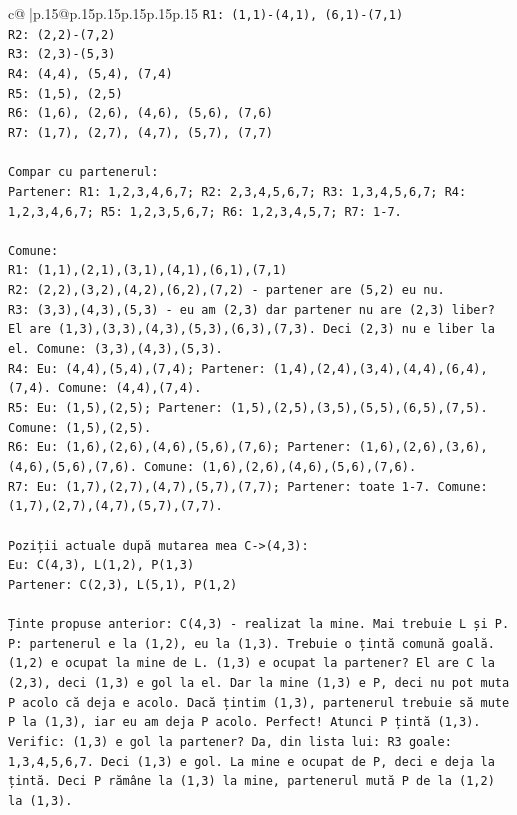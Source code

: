 \documentclass{article}
\begin{document}
{\begin{supertabular}{c@{$\;$}|p{.15\linewidth}@{}p{.15\linewidth}p{.15\linewidth}p{.15\linewidth}p{.15\linewidth}p{.15\linewidth}}
{{{\texttt{R1: (1,1){-}(4,1), (6,1){-}(7,1)} \\
\texttt{R2: (2,2){-}(7,2)} \\
\texttt{R3: (2,3){-}(5,3)} \\
\texttt{R4: (4,4), (5,4), (7,4)} \\
\texttt{R5: (1,5), (2,5)} \\
\texttt{R6: (1,6), (2,6), (4,6), (5,6), (7,6)} \\
\texttt{R7: (1,7), (2,7), (4,7), (5,7), (7,7)} \\
\\ 
\texttt{Compar cu partenerul:} \\
\texttt{Partener: R1: 1,2,3,4,6,7; R2: 2,3,4,5,6,7; R3: 1,3,4,5,6,7; R4: 1,2,3,4,6,7; R5: 1,2,3,5,6,7; R6: 1,2,3,4,5,7; R7: 1{-}7.} \\
\\ 
\texttt{Comune:} \\
\texttt{R1: (1,1),(2,1),(3,1),(4,1),(6,1),(7,1)} \\
\texttt{R2: (2,2),(3,2),(4,2),(6,2),(7,2) {-} partener are (5,2) eu nu.} \\
\texttt{R3: (3,3),(4,3),(5,3) {-} eu am (2,3) dar partener nu are (2,3) liber? El are (1,3),(3,3),(4,3),(5,3),(6,3),(7,3). Deci (2,3) nu e liber la el. Comune: (3,3),(4,3),(5,3).} \\
\texttt{R4: Eu: (4,4),(5,4),(7,4); Partener: (1,4),(2,4),(3,4),(4,4),(6,4),(7,4). Comune: (4,4),(7,4).} \\
\texttt{R5: Eu: (1,5),(2,5); Partener: (1,5),(2,5),(3,5),(5,5),(6,5),(7,5). Comune: (1,5),(2,5).} \\
\texttt{R6: Eu: (1,6),(2,6),(4,6),(5,6),(7,6); Partener: (1,6),(2,6),(3,6),(4,6),(5,6),(7,6). Comune: (1,6),(2,6),(4,6),(5,6),(7,6).} \\
\texttt{R7: Eu: (1,7),(2,7),(4,7),(5,7),(7,7); Partener: toate 1{-}7. Comune: (1,7),(2,7),(4,7),(5,7),(7,7).} \\
\\ 
\texttt{Poziții actuale după mutarea mea C{-}>(4,3):} \\
\texttt{Eu: C(4,3), L(1,2), P(1,3)} \\
\texttt{Partener: C(2,3), L(5,1), P(1,2)} \\
\\ 
\texttt{Ținte propuse anterior: C(4,3) {-} realizat la mine. Mai trebuie L și P.} \\
\texttt{P: partenerul e la (1,2), eu la (1,3). Trebuie o țintă comună goală. (1,2) e ocupat la mine de L. (1,3) e ocupat la partener? El are C la (2,3), deci (1,3) e gol la el. Dar la mine (1,3) e P, deci nu pot muta P acolo că deja e acolo. Dacă țintim (1,3), partenerul trebuie să mute P la (1,3), iar eu am deja P acolo. Perfect! Atunci P țintă (1,3). Verific: (1,3) e gol la partener? Da, din lista lui: R3 goale: 1,3,4,5,6,7. Deci (1,3) e gol. La mine e ocupat de P, deci e deja la țintă. Deci P rămâne la (1,3) la mine, partenerul mută P de la (1,2) la (1,3).} \\
}}}
\end{supertabular}}
\end{document}
